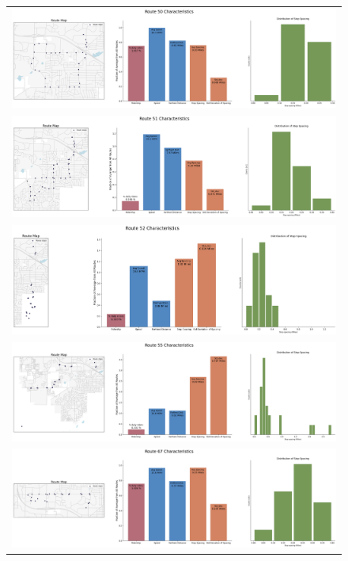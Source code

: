\documentclass[letter]{article}
\begin{document}
\begin{figure}
\begin{center}
\begin{tabular}{ c }

  \includegraphics[width=150mm]{Route_50.png}  \\
  \includegraphics[width=150mm]{Route_51.png} \\ 
  \includegraphics[width=150mm]{Route_52.png}  \\
  \includegraphics[width=150mm]{Route_55.png}  \\
  \includegraphics[width=150mm]{Route_67.png}  \\
  
  \end{tabular}
\end{center}
\end{figure}
\end{document}
